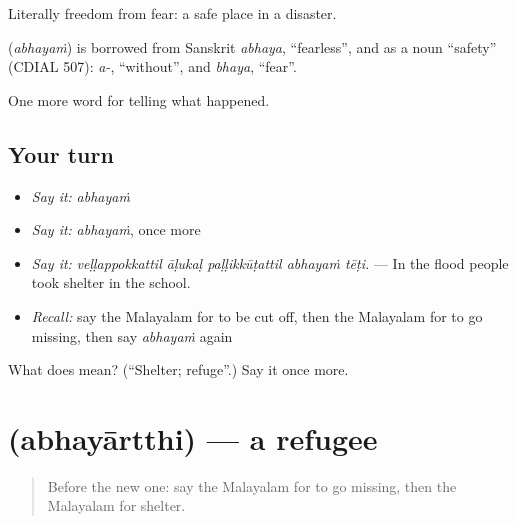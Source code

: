 Literally freedom from fear: a safe place in a disaster.

\begin{cousinweb}
\textbf{} (\emph{abhayaṁ}) is borrowed from Sanskrit \emph{abhaya}, \textquotedblleft{}fearless\textquotedblright{}, and as a noun \textquotedblleft{}safety\textquotedblright{} (CDIAL 507): \emph{a-}, \textquotedblleft{}without\textquotedblright{}, and \emph{bhaya}, \textquotedblleft{}fear\textquotedblright{}.
\end{cousinweb}

\begin{grammarlens}[title={What you've built}]
One more word for telling what happened.
\end{grammarlens}

\subsection*{Your turn}
\begin{itemize}
\raggedright
  \item \emph{Say it:} \emph{abhayaṁ}
  \item \emph{Say it:} \emph{abhayaṁ}, once more
  \item \emph{Say it:} \emph{veḷḷappokkattil āḷukaḷ paḷḷikkūṭattil abhayaṁ tēṭi.} — In the flood people took shelter in the school.
  \item \emph{Recall:} say the Malayalam for to be cut off, then the Malayalam for to go missing, then say \emph{abhayaṁ} again
\end{itemize}

\begin{tcolorbox}[breakable,colback=teal!4,colframe=teal!35!black,title={Before you move on}]
What does  mean? (\textquotedblleft{}Shelter; refuge\textquotedblright{}.) Say it once more.
\end{tcolorbox}
\section[\texorpdfstring{\ml{അഭയാർത്ഥി} (abhayārtthi)}{അഭയാർത്ഥി (abhayārtthi)}]{ (abhayārtthi) — a refugee}

\label{lesson:ML-C378-abhayartthi}



\begin{quote}
Before the new one: say the Malayalam for to go missing, then the Malayalam for shelter.
\end{quote}

